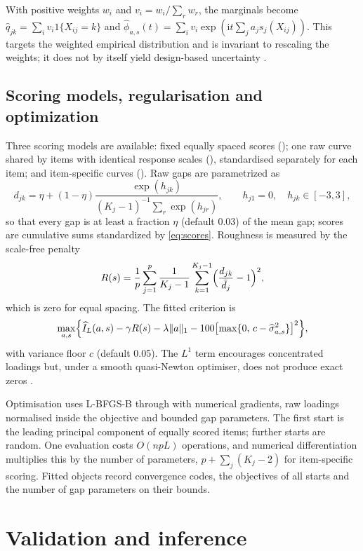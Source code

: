 With positive weights $w_i$ and $v_i=w_i/\sum_r w_r$, the marginals become $\widehat q_{jk}=\sum_iv_i1\{X_{ij}=k\}$ and $\widehat\phi_{a,s}(t)=\sum_iv_i\exp(\mathrm{i}t\sum_ja_js_j(X_{ij}))$. This targets the weighted empirical distribution and is invariant to rescaling the weights; it does not by itself yield design-based uncertainty \citep{lumley2004,rao1988}.

\subsection{Scoring models, regularisation and optimization}
Three scoring models are available: fixed equally spaced scores (); one raw curve shared by items with identical response scales (), standardised separately for each item; and item-specific curves (). Raw gaps are parametrized as
\begin{equation}\label{eq:gaps}
 d_{jk}=\eta+(1-\eta)\frac{\exp(h_{jk})}{(K_j-1)^{-1}\sum_r\exp(h_{jr})},\qquad h_{j1}=0,\quad h_{jk}\in[-3,3],
\end{equation}
so that every gap is at least a fraction $\eta$ (default 0.03) of the mean gap; scores are cumulative sums standardized by \eqref{eq:scores}. Roughness is measured by the scale-free penalty
\[
 R(s)=\frac1p\sum_{j=1}^p\frac1{K_j-1}\sum_{k=1}^{K_j-1}\Bigl(\frac{d_{jk}}{\bar d_j}-1\Bigr)^2,
\]
which is zero for equal spacing. The fitted criterion is
\begin{equation}\label{eq:fit}
 \max_{a,s}\Bigl\{\widehat I_L(a,s)-\gamma R(s)-\lambda\|a\|_1-100\bigl[\max\{0,\,c-\widehat\sigma^2_{a,s}\}\bigr]^2\Bigr\},
\end{equation}
with variance floor $c$ (default 0.05). The $L^1$ term encourages concentrated loadings but, under a smooth quasi-Newton optimiser, does not produce exact zeros \citep{zou2006}.

Optimisation uses L-BFGS-B \citep{byrd1995} through  with numerical gradients, raw loadings normalised inside the objective and bounded gap parameters. The first start is the leading principal component of equally scored items; further starts are random. One evaluation costs $O(npL)$ operations, and numerical differentiation multiplies this by the number of parameters, $p+\sum_j(K_j-2)$ for item-specific scoring. Fitted objects record convergence codes, the objectives of all starts and the number of gap parameters on their bounds.

\section{Validation and inference}
